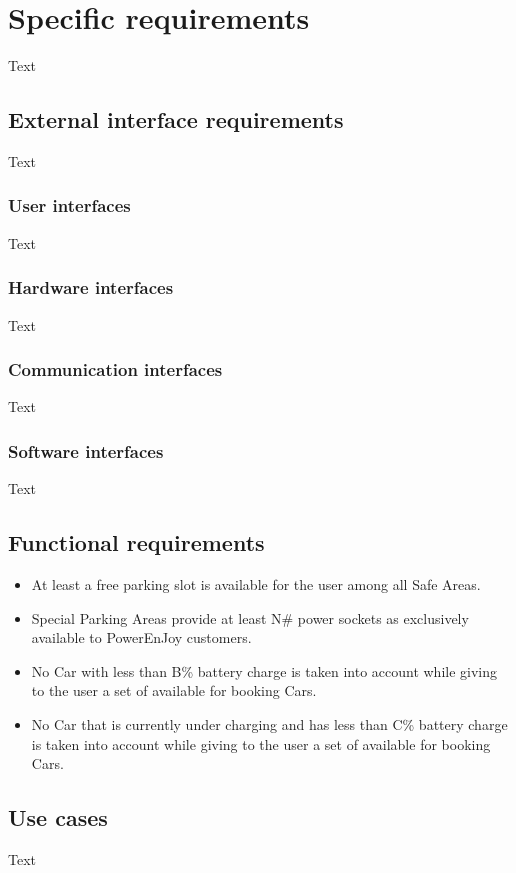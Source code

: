 \section{Specific requirements}
Text
\subsection{External interface requirements}
Text
\subsubsection{User interfaces}
Text
\subsubsection{Hardware interfaces}
Text
\subsubsection{Communication interfaces}
Text
\subsubsection{Software interfaces}
Text
\subsection{Functional requirements}
\begin{itemize}
\item At least a free parking slot is available for the user among all Safe Areas.
\item Special Parking Areas provide at least N\# power sockets as exclusively available to PowerEnJoy customers.
\item No Car with less than B\% battery charge is taken into account while giving to the user a set of available for booking Cars.
\item No Car that is currently under charging and has less than C\% battery charge is taken into account while giving to the user a set of available for booking Cars.
\end{itemize}
\subsection{Use cases}
Text